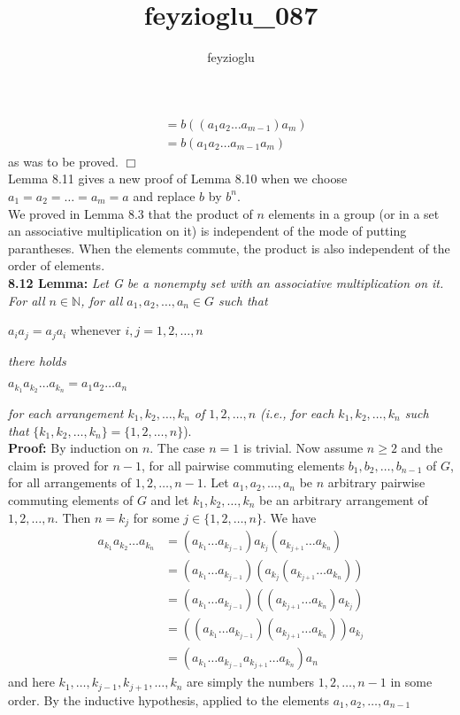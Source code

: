\documentclass[11pt]{amsbook}
\title{feyzioglu_087}
\author{feyzioglu}
\begin{document}

\begin{align*}
	&= b((a_{1}a_{2} \ldots a_{m - 1})a_m)  \\
	&= b(a_{1}a_{2} \ldots a_{m - 1}a_m)
\end{align*}
as was to be proved. \hfill\(\Box\) \\[0.5in]
Lemma 8.11 gives a new proof of Lemma 8.10 when we choose \\
$ a_1 = a_2 = \ldots = a_m = a $ and replace $ b $ by $ b^n $.\\[0.1in]
We proved in Lemma 8.3 that the product of $ n $ elements in a group
(or in a set an associative multiplication on it) is independent
of the mode of putting parantheses. When the elements commute, the
product is also independent of the order of elements. \\[0.4in]
\textbf{8.12 Lemma:} \textit{Let G be a nonempty set with an associative
multiplication on it. For all $ n \in \mathbb N $,
for all $ a_1, a_2, \ldots, a_n \in G $ such that}

\begin{center}
	$ a_{i}a_{j} = a_{j}a_{i} $ whenever $ i,j = 1,2,\ldots,n $
\end{center}
\textit{there holds}
\begin{center}
	$ a_{k_{1}}a_{k_{2}} \ldots a_{k_{n}} = a_{1}a_{2} \ldots a_{n} $
\end{center}
\textit{for each arrangement $ k_1, k_2, \ldots, k_n $ of $ 1,2, \ldots, n $
(i.e., for each $ k_1, k_2, \ldots, k_n $ such that}
$ \{k_1, k_2, \ldots, k_n\} = \{1,2,\ldots,n\} $).\\[0.1in]
\textbf{Proof:} By induction on $ n $. The case $ n = 1 $ is trivial.
Now assume $ n \geq 2 $ and the claim is proved for $ n - 1 $, for all
pairwise commuting elements $ b_1, b_2, \ldots, b_{n - 1} $ of $ G $,
for all arrangements of $ 1,2, \ldots, n - 1 $. Let $ a_1, a_2, \ldots, a_n $
be $ n $ arbitrary pairwise commuting elements of $ G $ and let
$ k_1, k_2, \ldots, k_n $ be an arbitrary arrangement of
$ 1,2, \ldots, n $. Then $ n = k_j $ for some $ j \in \{1,2, \ldots, n \} $.
We have
\begin{align*}
	a_{k_1}a_{k_2} \ldots a_{k_n} &= (a_{k_1} \ldots a_{k_{j-1}})a_{k_j}(a_{k_{j+1}} \ldots a_{k_n})   \\
								  &= (a_{k_1} \ldots a_{k_{j-1}})(a_{k_j}(a_{k_{j+1}} \ldots a_{k_n})) \\
								  &= (a_{k_1} \ldots a_{k_{j-1}})(({a_{k_{j+1}} \ldots a_{k_n}})a_{k_j})  \\
								  &= ((a_{k_1} \ldots a_{k_{j-1}})({a_{k_{j+1}} \ldots a_{k_n}}))a_{k_j}  \\
								  &= (a_{k_1} \ldots a_{k_{j-1}}{a_{k_{j+1}} \ldots a_{k_n}})a_n
\end{align*}
and here $ k_1, \ldots, k_{j - 1}, k_{j + 1}, \ldots, k_n $
are simply the numbers $ 1,2, \ldots, n - 1 $ in some order.
By the inductive hypothesis, applied to the
elements $ a_1, a_2, \ldots, a_{n - 1} $
\end{document}
